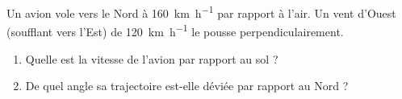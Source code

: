 \documentclass[11pt,a4paper]{article}
\begin{document}
\begin{exo}
Un avion vole vers le Nord à \qty{160}{\kilo\metre\per\hour} par rapport à l'air. Un vent d'Ouest
(soufflant vers l'Est) de \qty{120}{\kilo\metre\per\hour} le pousse perpendiculairement.
\begin{enumerate}[label=\alph*)]
  \item Quelle est la vitesse de l'avion par rapport au sol ?
  \item De quel angle sa trajectoire est-elle déviée par rapport au Nord ?
\end{enumerate}
\end{exo}
\end{document}
